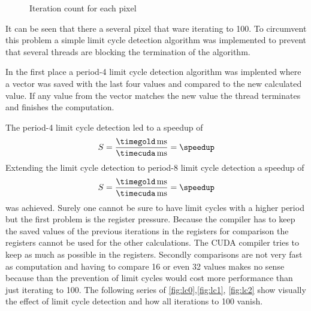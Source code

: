 \begin{figure}[ht] \centering
\caption{Iteration count for each pixel}
\label{fig:lc}%
\end{figure}

It can be seen that there a several pixel that ware iterating to 100. To circumvent
this problem a simple limit cycle detection algorithm was implemented to prevent
that several threads are blocking the termination of the algorithm. 

In the first place a period-4 limit cycle detection algorithm was implented where
a vector was saved with the last four values and compared to the new calculated 
value. If any value from the vector matches the new value the thread terminates
and finishes the computation. 

The period-4 limit cycle detection led to a speedup of 
\fpDiv{\speedup}{\timegold}{\timecuda}
\begin{equation*}\label{eq:speedup9}
	S = \frac{\unit[\timegold]{ms}}{\unit[\timecuda]{ms}} = \speedup
\end{equation*}
Extending the limit cycle detection to period-8 limit cycle detection a speedup
of 
\fpDiv{\speedup}{\timegold}{\timecuda}
\begin{equation*}\label{eq:speedup10}
	S = \frac{\unit[\timegold]{ms}}{\unit[\timecuda]{ms}} = \speedup
\end{equation*}
was achieved. Surely one cannot be sure to have limit cycles with a higher
period but the first problem is the register pressure. Because the compiler has
to keep the saved values of the previous iterations in the registers for
comparison the registers cannot be used for the other calculations. The
\gls{CUDA} compiler tries to keep as much as possible in the registers. Secondly
comparisons are not very fast as computation and having to compare 16 or even 32
values makes no sense because than the prevention of limit cycles would cost
more performance than just iterating to 100. The following series of
\autoref{fig:lc0},\autoref{fig:lc1}, \autoref{fig:lc2} show visually the effect
of limit cycle detection and how all iterations to 100 vanish.

